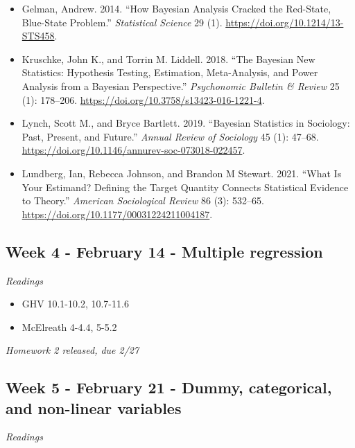 \documentclass[
  10pt,
]{article}
\providecommand{\tightlist}{%
  \setlength{\itemsep}{0pt}\setlength{\parskip}{0pt}}
\begin{document}
\begin{itemize}
\tightlist
\item
  Gelman, Andrew. 2014. ``How Bayesian Analysis Cracked the Red-State,
  Blue-State Problem.'' \emph{Statistical Science} 29 (1).
  \url{https://doi.org/10.1214/13-STS458}.
\item
  Kruschke, John K., and Torrin M. Liddell. 2018. ``The Bayesian New
  Statistics: Hypothesis Testing, Estimation, Meta-Analysis, and Power
  Analysis from a Bayesian Perspective.'' \emph{Psychonomic Bulletin \&
  Review} 25 (1): 178--206.
  \url{https://doi.org/10.3758/s13423-016-1221-4}.
\item
  Lynch, Scott M., and Bryce Bartlett. 2019. ``Bayesian Statistics in
  Sociology: Past, Present, and Future.'' \emph{Annual Review of
  Sociology} 45 (1): 47--68.
  \url{https://doi.org/10.1146/annurev-soc-073018-022457}.
\item
  Lundberg, Ian, Rebecca Johnson, and Brandon M Stewart. 2021. ``What Is
  Your Estimand? Defining the Target Quantity Connects Statistical
  Evidence to Theory.'' \emph{American Sociological Review} 86 (3):
  532--65. \url{https://doi.org/10.1177/00031224211004187}.
\end{itemize}

\hypertarget{week-4---february-14---multiple-regression}{%
\subsection{Week 4 - February 14 - Multiple
regression}\label{week-4---february-14---multiple-regression}}

\emph{Readings}

\begin{itemize}
\tightlist
\item
  GHV 10.1-10.2, 10.7-11.6
\item
  McElreath 4-4.4, 5-5.2
\end{itemize}

\emph{Homework 2 released, due 2/27}

\hypertarget{week-5---february-21---dummy-categorical-and-non-linear-variables}{%
\subsection{Week 5 - February 21 - Dummy, categorical, and non-linear
variables}\label{week-5---february-21---dummy-categorical-and-non-linear-variables}}

\emph{Readings}
\end{document}
